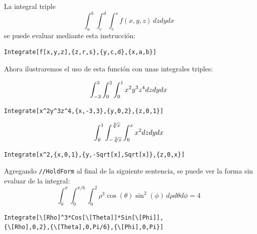 La integral triple \[\int_a^b \int_c^d \int_e^s f(x,y,z)\, dzdydx\]
se puede evaluar mediante esta instrucción:
\begin{tcolorbox}[title=Integrales triples]
\begin{Verbatim}[formatcom=\letraverbatim]
Integrate[f[x,y,z],{z,r,s},{y,c,d},{x,a,b}]
\end{Verbatim}
\end{tcolorbox}
Ahora ilustraremos el uso de esta función con unas integrales triples:
\begin{parrafonumerado}
\item %
\[\displaystyle \int_{-3}^3 \int_0^2 \int_0^1  x^2 y^3 z^4 dzdy dx\] %
\begin{tcolorbox}
\begin{Verbatim}[formatcom=\letraverbatim]
Integrate[x^2y^3z^4,{x,-3,3},{y,0,2},{z,0,1}]
\end{Verbatim}
\end{tcolorbox}
\item %
\[\displaystyle \int_{0}^{1}\int_{-\sqrt[2]{x}}^{\sqrt[2]{x}}\int_{0}^{x}x^{2}dzdydx\] %
\begin{tcolorbox}
\begin{Verbatim}[formatcom=\letraverbatim]
Integrate[x^2,{x,0,1},{y,-Sqrt[x],Sqrt[x]},{z,0,x}]
\end{Verbatim}
\end{tcolorbox}

\item Agregando \verb"//HoldForm" al final de la siguiente sentencia, se puede ver la forma sin evaluar de la integral:
\[\int_0^\pi\int_0^{\pi/6} \int_0^2 \rho^3 \cos(\theta)\sin^2(\phi)\, d\rho d \theta d\phi=4  \]
\begin{tcolorbox}
\begin{Verbatim}[formatcom=\letraverbatim]
Integrate[\[Rho]^3*Cos[\[Theta]]*Sin[\[Phi]],
{\[Rho],0,2},{\[Theta],0,Pi/6},{\[Phi],0,Pi}]
\end{Verbatim}
\end{tcolorbox}


\end{parrafonumerado}
